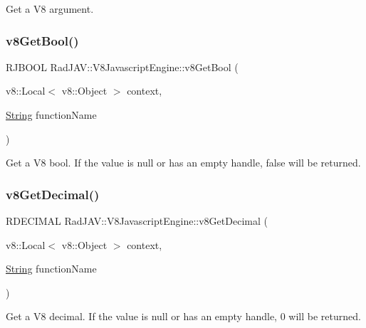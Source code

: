 Get a V8 argument. 

\mbox{\label{class_rad_j_a_v_1_1_v8_javascript_engine_a688c6447c659170b028377150859996c}} 
\subsubsection{\texorpdfstring{v8\+Get\+Bool()}{v8GetBool()}}
{\footnotesize\ttfamily R\+J\+B\+O\+OL Rad\+J\+A\+V\+::\+V8\+Javascript\+Engine\+::v8\+Get\+Bool (\begin{DoxyParamCaption}\item[{v8\+::\+Local$<$ v8\+::\+Object $>$}]{context,  }\item[{\mbox{\hyperlink{class_rad_j_a_v_1_1_string}{String}}}]{function\+Name }\end{DoxyParamCaption})}



Get a V8 bool. If the value is null or has an empty handle, false will be returned. 

\mbox{\label{class_rad_j_a_v_1_1_v8_javascript_engine_a27221a196a2a0d65c687c013c71cf5c0}} 
\subsubsection{\texorpdfstring{v8\+Get\+Decimal()}{v8GetDecimal()}}
{\footnotesize\ttfamily R\+D\+E\+C\+I\+M\+AL Rad\+J\+A\+V\+::\+V8\+Javascript\+Engine\+::v8\+Get\+Decimal (\begin{DoxyParamCaption}\item[{v8\+::\+Local$<$ v8\+::\+Object $>$}]{context,  }\item[{\mbox{\hyperlink{class_rad_j_a_v_1_1_string}{String}}}]{function\+Name }\end{DoxyParamCaption})}



Get a V8 decimal. If the value is null or has an empty handle, 0 will be returned. 

